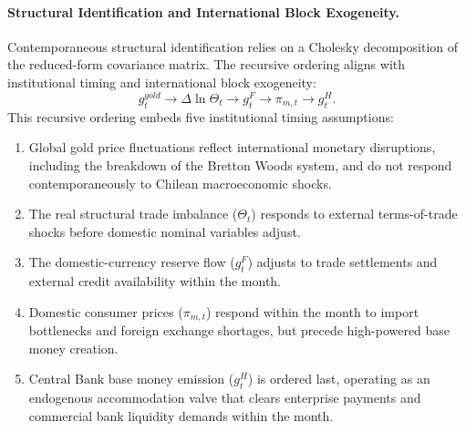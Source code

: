 \paragraph{Structural Identification and International Block Exogeneity.}
Contemporaneous structural identification relies on a Cholesky decomposition of the reduced-form covariance matrix. The recursive ordering aligns with institutional timing and international block exogeneity:
\begin{equation}
    g^{gold}_t \longrightarrow \Delta \ln \Theta_t \longrightarrow g^F_t \longrightarrow \pi_{m,t} \longrightarrow g^H_t.
    \label{eq:tvar_cholesky_order}
\end{equation}
This recursive ordering embeds five institutional timing assumptions:
\begin{enumerate}[leftmargin=*,itemsep=1pt]
    \item Global gold price fluctuations reflect international monetary disruptions, including the breakdown of the Bretton Woods system, and do not respond contemporaneously to Chilean macroeconomic shocks.
    \item The real structural trade imbalance ($\Theta_t$) responds to external terms-of-trade shocks before domestic nominal variables adjust.
    \item The domestic-currency reserve flow ($g^F_t$) adjusts to trade settlements and external credit availability within the month.
    \item Domestic consumer prices ($\pi_{m,t}$) respond within the month to import bottlenecks and foreign exchange shortages, but precede high-powered base money creation.
    \item Central Bank base money emission ($g^H_t$) is ordered last, operating as an endogenous accommodation valve that clears enterprise payments and commercial bank liquidity demands within the month.
\end{enumerate}

